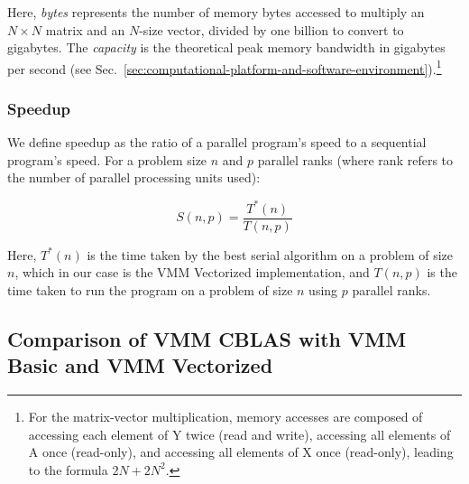 Here, \textit{bytes} represents the number of memory bytes accessed to multiply an \(N \times N\) matrix and an \(N\)-size vector, divided by one billion to convert to gigabytes. The \textit{capacity} is the theoretical peak memory bandwidth in gigabytes per second (see Sec.~\ref{sec:computational-platform-and-software-environment}).\footnote{For the matrix-vector multiplication, memory accesses are composed of accessing each element of Y twice (read and write), accessing all elements of A once (read-only), and accessing all elements of X once (read-only), leading to the formula \(2N + 2N^2\).}

\subsubsection{Speedup}
\label{subsubsec:speedup}
We define speedup as the ratio of a parallel program's speed to a sequential program's speed. For a problem size \(n\) and \(p\) parallel ranks (where rank refers to the number of parallel processing units used):

\begin{displaymath}
    S(n, p) = \frac{T^*(n)}{T(n, p)}
\end{displaymath}

Here, \(T^*(n)\) is the time taken by the best serial algorithm on a problem of size \(n\), which in our case is the VMM Vectorized implementation, and \(T(n, p)\) is the time taken to run the program on a problem of size \(n\) using \(p\) parallel ranks.

\subsection{Comparison of VMM CBLAS with VMM Basic and VMM Vectorized}
\label{subsec:comparison-serial}

